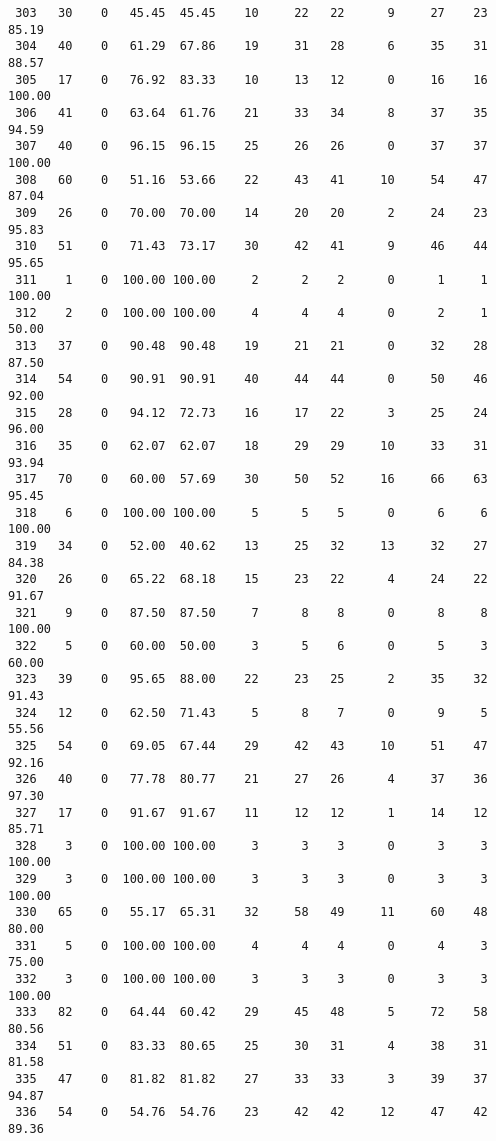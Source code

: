 \begin{verbatim}
 303   30    0   45.45  45.45    10     22   22      9     27    23    85.19
 304   40    0   61.29  67.86    19     31   28      6     35    31    88.57
 305   17    0   76.92  83.33    10     13   12      0     16    16   100.00
 306   41    0   63.64  61.76    21     33   34      8     37    35    94.59
 307   40    0   96.15  96.15    25     26   26      0     37    37   100.00
 308   60    0   51.16  53.66    22     43   41     10     54    47    87.04
 309   26    0   70.00  70.00    14     20   20      2     24    23    95.83
 310   51    0   71.43  73.17    30     42   41      9     46    44    95.65
 311    1    0  100.00 100.00     2      2    2      0      1     1   100.00
 312    2    0  100.00 100.00     4      4    4      0      2     1    50.00
 313   37    0   90.48  90.48    19     21   21      0     32    28    87.50
 314   54    0   90.91  90.91    40     44   44      0     50    46    92.00
 315   28    0   94.12  72.73    16     17   22      3     25    24    96.00
 316   35    0   62.07  62.07    18     29   29     10     33    31    93.94
 317   70    0   60.00  57.69    30     50   52     16     66    63    95.45
 318    6    0  100.00 100.00     5      5    5      0      6     6   100.00
 319   34    0   52.00  40.62    13     25   32     13     32    27    84.38
 320   26    0   65.22  68.18    15     23   22      4     24    22    91.67
 321    9    0   87.50  87.50     7      8    8      0      8     8   100.00
 322    5    0   60.00  50.00     3      5    6      0      5     3    60.00
 323   39    0   95.65  88.00    22     23   25      2     35    32    91.43
 324   12    0   62.50  71.43     5      8    7      0      9     5    55.56
 325   54    0   69.05  67.44    29     42   43     10     51    47    92.16
 326   40    0   77.78  80.77    21     27   26      4     37    36    97.30
 327   17    0   91.67  91.67    11     12   12      1     14    12    85.71
 328    3    0  100.00 100.00     3      3    3      0      3     3   100.00
 329    3    0  100.00 100.00     3      3    3      0      3     3   100.00
 330   65    0   55.17  65.31    32     58   49     11     60    48    80.00
 331    5    0  100.00 100.00     4      4    4      0      4     3    75.00
 332    3    0  100.00 100.00     3      3    3      0      3     3   100.00
 333   82    0   64.44  60.42    29     45   48      5     72    58    80.56
 334   51    0   83.33  80.65    25     30   31      4     38    31    81.58
 335   47    0   81.82  81.82    27     33   33      3     39    37    94.87
 336   54    0   54.76  54.76    23     42   42     12     47    42    89.36

\end{verbatim}
